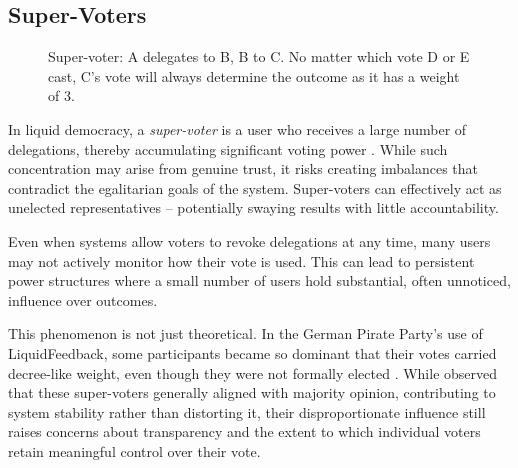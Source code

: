 \subsection*{Super-Voters}
\begin{figure}[H]
  \centering
  \caption{Super-voter: A delegates to B, B to C. No matter which vote D or E cast, C's vote will always determine the outcome as it has a weight of 3.}
  \label{fig:delegation-supervoter}
\end{figure}

In liquid democracy, a \textit{super-voter} is a user who receives a large number of delegations, thereby accumulating significant voting power \citep{kling2015votingbehaviourpoweronline}. While such concentration may arise from genuine trust, it risks creating imbalances that contradict the egalitarian goals of the system. Super-voters can effectively act as unelected representatives -- potentially swaying results with little accountability.

Even when systems allow voters to revoke delegations at any time, many users may not actively monitor how their vote is used. This can lead to persistent power structures where a small number of users hold substantial, often unnoticed, influence over outcomes.

This phenomenon is not just theoretical. In the German Pirate Party's use of LiquidFeedback, some participants became so dominant that their votes carried decree-like weight, even though they were not formally elected \citep{sven_becker_liquid_2012, kling2015votingbehaviourpoweronline}. While \citet{kling2015votingbehaviourpoweronline} observed that these super-voters generally aligned with majority opinion, contributing to system stability rather than distorting it, their disproportionate influence still raises concerns about transparency and the extent to which individual voters retain meaningful control over their vote.

